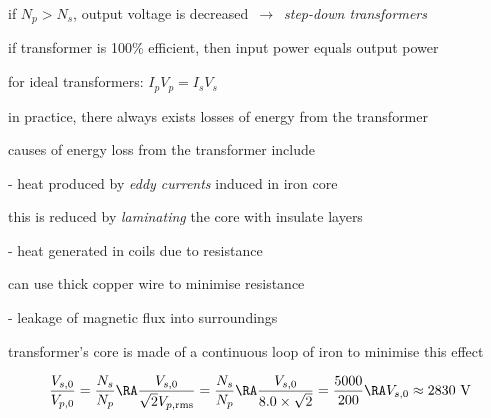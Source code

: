 if $N_p > N_s$, output voltage is decreased $\,\rightarrow\,$ \emph{step-down transformers}

\cmt if transformer is 100\% efficient, then input power equals output power

for ideal transformers: $\boxed{I_p V_p  = I_s V_s} $

\cmt in practice, there always exists losses of energy from the transformer

causes of energy loss from the transformer include

\begin{compactitem}
\item[-] heat produced by \emph{eddy currents} induced in iron core

this is reduced by \emph{laminating} the core with insulate layers

\item[-] heat generated in coils due to resistance

can use thick copper wire to minimise resistance

\item[-] leakage of magnetic flux into surroundings

transformer's core is made of a continuous loop of iron to minimise this effect

\end{compactitem}


\solc\begin{equation*}
\frac{V_{s,0}}{V_{p,0}} = \frac{N_s}{N_p} \RA 
\frac{V_{s,0}}{\sqrt{2}V_{p,\text{rms}}} = \frac{N_s}{N_p} \RA
\frac{V_{s,0}}{8.0\times\sqrt{2}} = \frac{5000}{200} \RA
V_{s,0} \approx 2830 \text{ V}   
\end{equation*}




